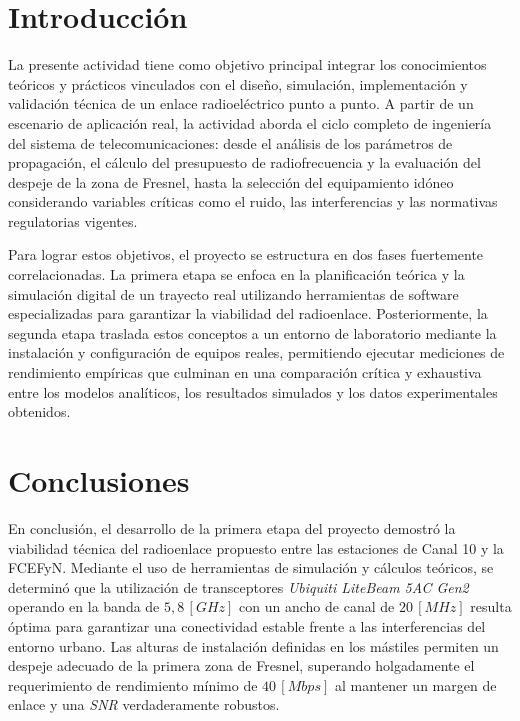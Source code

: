 \documentclass[12pt]{article}
\begin{document}
\tableofcontents
\newpage

\section{Introducción}
\label{sec_1}
La presente actividad tiene como objetivo principal integrar los conocimientos teóricos y prácticos vinculados con el diseño, simulación, implementación y validación técnica de un enlace radioeléctrico punto a punto. A partir de un escenario de aplicación real, la actividad aborda el ciclo completo de ingeniería del sistema de telecomunicaciones: desde el análisis de los parámetros de propagación, el cálculo del presupuesto de radiofrecuencia y la evaluación del despeje de la zona de Fresnel, hasta la selección del equipamiento idóneo considerando variables críticas como el ruido, las interferencias y las normativas regulatorias vigentes.

Para lograr estos objetivos, el proyecto se estructura en dos fases fuertemente correlacionadas. La primera etapa se enfoca en la planificación teórica y la simulación digital de un trayecto real utilizando herramientas de software especializadas para garantizar la viabilidad del radioenlace. Posteriormente, la segunda etapa traslada estos conceptos a un entorno de laboratorio mediante la instalación y configuración de equipos reales, permitiendo ejecutar mediciones de rendimiento empíricas que culminan en una comparación crítica y exhaustiva entre los modelos analíticos, los resultados simulados y los datos experimentales obtenidos.



\newpage




\newpage



\section{Conclusiones}
\label{sec_4}
En conclusión, el desarrollo de la primera etapa del proyecto demostró la viabilidad técnica del radioenlace propuesto entre las estaciones de Canal 10 y la FCEFyN. Mediante el uso de herramientas de simulación y cálculos teóricos, se determinó que la utilización de transceptores \textit{Ubiquiti LiteBeam 5AC Gen2} operando en la banda de $5,8 \, [GHz]$ con un ancho de canal de $20 \, [MHz]$ resulta óptima para garantizar una conectividad estable frente a las interferencias del entorno urbano. Las alturas de instalación definidas en los mástiles permiten un despeje adecuado de la primera zona de Fresnel, superando holgadamente el requerimiento de rendimiento mínimo de $40 \, [Mbps]$ al mantener un margen de enlace y una \textit{SNR} verdaderamente robustos. 
\end{document}
